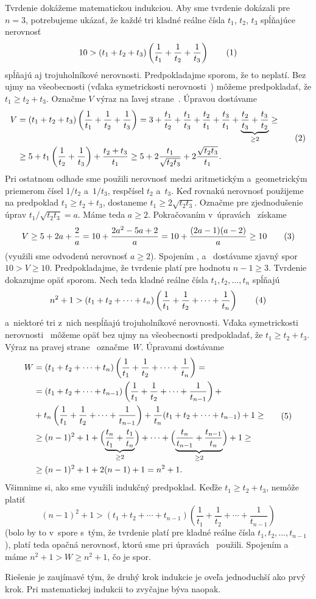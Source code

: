 {%
Tvrdenie dokážeme matematickou indukciou. 
Aby sme tvrdenie dokázali pre $n=3$, potrebujeme ukázať, že každé tri kladné reálne čísla $t_1$, $t_2$, $t_3$ spĺňajúce nerovnosť
$$
10>(t_1+t_2+t_3)\left(\frac1{t_1}+\frac1{t_2}+\frac1{t_3}\right)
\tag1
$$
spĺňajú aj trojuholníkové nerovnosti. Predpokladajme sporom, že to neplatí. Bez ujmy na všeobecnosti (vďaka symetrickosti nerovnosti~) môžeme predpokladať, že $t_1\ge t_2+t_3$. Označme $V$ výraz na ľavej
strane~. Úpravou dostávame
$$
\aligned
V&=(t_1+t_2+t_3)\left(\frac1{t_1}+\frac1{t_2}+\frac1{t_3}\right)=
3+\frac{t_1}{t_2}+\frac{t_1}{t_3}+\frac{t_2}{t_1}+\frac{t_3}{t_1}+\underbrace{\frac{t_2}{t_3}+\frac{t_3}{t_2}}_{\ge2}\ge\\
&\ge 5+t_1\left(\frac1{t_2}+\frac1{t_3}\right)+\frac{t_2+t_3}{t_1}\ge 
5+2\frac{t_1}{\sqrt{t_2t_3}}+2\frac{\sqrt{t_2t_3}}{t_1}.
\endaligned
\tag2
$$
Pri ostatnom odhade sme použili nerovnosť medzi aritmetickým a~geometrickým priemerom čísel $1/t_2$ a~$1/t_3$, resp\. čísel $t_2$ a~$t_3$. Keď rovnakú nerovnosť použijeme na predpoklad $t_1\ge t_2+t_3$, dostaneme $t_1\ge 2\sqrt{t_2t_3}$.
Označme pre zjednodušenie úprav $t_1/\sqrt{t_2t_3}=a$. Máme teda $a\ge2$. Pokračovaním v~úpravách~ získame
$$
V\ge 5+2a+\frac{2}{a}=10+\frac{2a^2-5a+2}{a}=10+\frac{(2a-1)(a-2)}{a}\ge10
\tag3
$$
(využili sme odvodenú nerovnosť $a\ge2$). Spojením ,  a~ dostávame zjavný spor $10>V\ge10$.
Predpokladajme, že tvrdenie platí pre hodnotu $n-1\ge3$. Tvrdenie dokazujme opäť sporom. Nech teda kladné reálne čísla $t_1,t_2,\dots,t_n$ spĺňajú
$$
n^2+1>(t_1+t_2+\cdots+t_n)\left(\frac{1}{t_1}+\frac{1}{t_2}+\cdots+\frac{1}{t_n}\right)
\tag4
$$
a~niektoré tri z~nich nespĺňajú trojuholníkové nerovnosti. Vďaka symetrickosti nerovnosti~ môžeme opäť bez ujmy na všeobecnosti predpokladať, že $t_1\ge t_2+t_3$. Výraz na pravej strane~ označme~$W$. Úpravami dostávame
$$
\aligned
W&=(t_1+t_2+\cdots+t_n)\left(\frac{1}{t_1}+\frac{1}{t_2}+\cdots+\frac{1}{t_n}\right)=\\
&=(t_1+t_2+\cdots+t_{n-1})\left(\frac{1}{t_1}+\frac{1}{t_2}+\cdots+\frac{1}{t_{n-1}}\right)+\\
&+t_n\left(\frac{1}{t_1}+\frac{1}{t_2}+\cdots+\frac{1}{t_{n-1}}\right)+
\frac1{t_n}(t_1+t_2+\cdots+t_{n-1})+1\ge\\
&\ge(n-1)^2+1+\Bigl(\underbrace{\frac{t_n}{t_1}+\frac{t_1}{t_n}}_{\ge2}\Bigr)+\cdots+
\Bigl(\underbrace{\frac{t_n}{t_{n-1}}+\frac{t_{n-1}}{t_n}}_{\ge2}\Bigr)+1\ge\\
&\ge(n-1)^2+1+2(n-1)+1=n^2+1.
\endaligned
\tag5
$$
Všimnime si, ako sme využili indukčný predpoklad. Keďže $t_1\ge t_2+t_3$, nemôže platiť
$$
(n-1)^2+1>(t_1+t_2+\cdots+t_{n-1})\left(\frac{1}{t_1}+\frac{1}{t_2}+\cdots+\frac{1}{t_{n-1}}\right)
$$
(bolo by to v~spore s~tým, že tvrdenie platí pre kladné reálne čísla $t_1,t_2,\dots,t_{n-1}$), platí teda opačná nerovnosť, ktorú sme pri úpravách~ použili. Spojením  a~ máme $n^2+1>W\ge n^2+1$, čo je spor.

\poznamka
Riešenie je zaujímavé tým, že druhý krok indukcie je oveľa jednoduchší ako prvý krok. Pri matematickej indukcii to zvyčajne býva naopak.}

